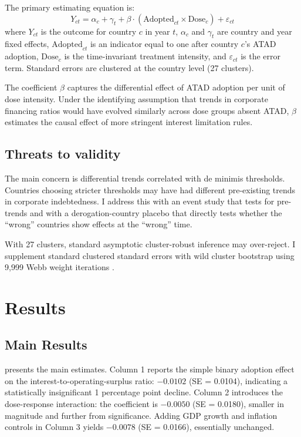 \documentclass[12pt]{article}
\begin{document}
The primary estimating equation is:
\begin{equation}
Y_{ct} = \alpha_c + \gamma_t + \beta \cdot (\text{Adopted}_{ct} \times \text{Dose}_c) + \varepsilon_{ct}
\label{eq:main}
\end{equation}
where $Y_{ct}$ is the outcome for country $c$ in year $t$, $\alpha_c$ and $\gamma_t$ are country and year fixed effects, $\text{Adopted}_{ct}$ is an indicator equal to one after country $c$'s ATAD adoption, $\text{Dose}_c$ is the time-invariant treatment intensity, and $\varepsilon_{ct}$ is the error term. Standard errors are clustered at the country level (27 clusters).

The coefficient $\beta$ captures the differential effect of ATAD adoption per unit of dose intensity. Under the identifying assumption that trends in corporate financing ratios would have evolved similarly across dose groups absent ATAD, $\beta$ estimates the causal effect of more stringent interest limitation rules.

\subsection{Threats to validity}

The main concern is differential trends correlated with de minimis thresholds. Countries choosing stricter thresholds may have had different pre-existing trends in corporate indebtedness. I address this with an event study that tests for pre-trends and with a derogation-country placebo that directly tests whether the ``wrong'' countries show effects at the ``wrong'' time.

With 27 clusters, standard asymptotic cluster-robust inference may over-reject. I supplement standard clustered standard errors with wild cluster bootstrap using 9,999 Webb weight iterations \citep{cameron2008bootstrap, webb2014reworking}.


\section{Results}

\subsection{Main Results}



 presents the main estimates. Column 1 reports the simple binary adoption effect on the interest-to-operating-surplus ratio: $-0.0102$ (SE = 0.0104), indicating a statistically insignificant 1 percentage point decline. Column 2 introduces the dose-response interaction: the coefficient is $-0.0050$ (SE = 0.0180), smaller in magnitude and further from significance. Adding GDP growth and inflation controls in Column 3 yields $-0.0078$ (SE = 0.0166), essentially unchanged.
\end{document}
